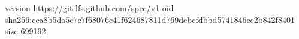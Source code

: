 version https://git-lfs.github.com/spec/v1
oid sha256:cca8b5da5c7c7f68076c41f624687811d769debcfdbbd5741846ec2b842f8401
size 699192
